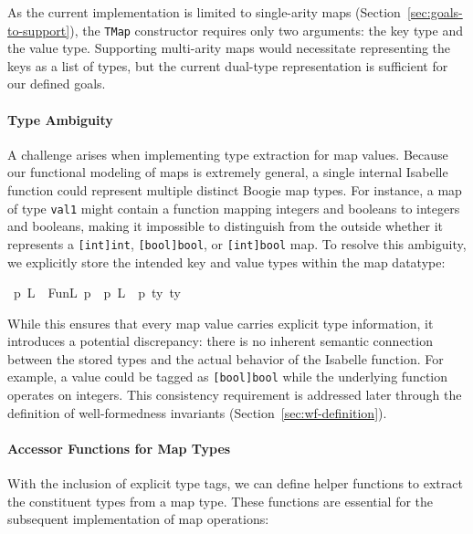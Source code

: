 \documentclass[11pt]{article}
\begin{document}
As the current implementation is limited to single-arity maps
(Section~\ref{sec:goals-to-support}), the \texttt{TMap} constructor requires only two arguments:
the key type and the value type.
Supporting multi-arity maps would necessitate representing the keys as a list of types,
but the current dual-type representation is sufficient for our defined goals.

\paragraph{Type Ambiguity}
A challenge arises when implementing type extraction for map values.
Because our functional modeling of maps is extremely general,
a single internal Isabelle function could represent multiple distinct Boogie map types.
For instance, a map of type \texttt{val1} might contain a function mapping integers and booleans to integers and booleans,
making it impossible to distinguish from the outside whether it represents
a \texttt{[int]int}, \texttt{[bool]bool}, or \texttt{[int]bool} map.
To resolve this ambiguity, we explicitly store the intended key and value types within the map datatype:

\begin{isabellebody}
\isanewline
{}\isamarkupfalse%
\ {\isacharprime}{\kern0pt}p\ L\ {\isacharequal}{\kern0pt}\ FunL\ {\isachardoublequoteopen}{\isacharprime}{\kern0pt}p\ {\isasymRightarrow}\ {\isacharprime}{\kern0pt}p\ L\ {\isacharplus}{\kern0pt}\ {\isacharprime}{\kern0pt}p{\isachardoublequoteclose}\ ty\ ty
\end{isabellebody}


While this ensures that every map value carries explicit type information,
it introduces a potential discrepancy:
there is no inherent semantic connection between the stored types and the actual behavior of the Isabelle function.
For example, a value could be tagged as \texttt{[bool]bool} while the underlying function operates on integers.
This consistency requirement is addressed later through the definition of well-formedness invariants (Section~\ref{sec:wf-definition}).

\paragraph{Accessor Functions for Map Types}
With the inclusion of explicit type tags,
we can define helper functions to extract the constituent types from a map type.
These functions are essential for the subsequent implementation of map operations:
\end{document}
